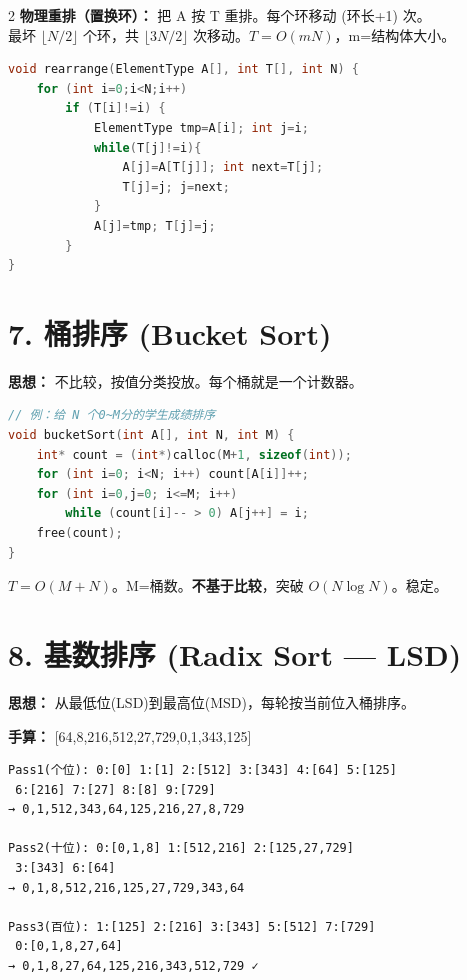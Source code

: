 \documentclass[10pt,a4paper]{article}
\begin{document}
\begin{multicols}{2}
\textbf{物理重排（置换环）：} 把 A 按 T 重排。每个环移动 (环长+1) 次。\\
最坏 $\lfloor N/2\rfloor$ 个环，共 $\lfloor 3N/2\rfloor$ 次移动。$T=O(mN)$，m=结构体大小。

\begin{lstlisting}[language=C]
void rearrange(ElementType A[], int T[], int N) {
    for (int i=0;i<N;i++)
        if (T[i]!=i) {
            ElementType tmp=A[i]; int j=i;
            while(T[j]!=i){
                A[j]=A[T[j]]; int next=T[j];
                T[j]=j; j=next;
            }
            A[j]=tmp; T[j]=j;
        }
}
\end{lstlisting}

\section*{7. 桶排序 (Bucket Sort)}

\textbf{思想：} 不比较，按值分类投放。每个桶就是一个计数器。

\begin{lstlisting}[language=C]
// 例：给 N 个0~M分的学生成绩排序
void bucketSort(int A[], int N, int M) {
    int* count = (int*)calloc(M+1, sizeof(int));
    for (int i=0; i<N; i++) count[A[i]]++;
    for (int i=0,j=0; i<=M; i++)
        while (count[i]-- > 0) A[j++] = i;
    free(count);
}
\end{lstlisting}

$T = O(M+N)$。M=桶数。\textbf{不基于比较}，突破 $O(N\log N)$。稳定。

\section*{8. 基数排序 (Radix Sort — LSD)}

\textbf{思想：} 从最低位(LSD)到最高位(MSD)，每轮按当前位入桶排序。

\textbf{手算：} [64,8,216,512,27,729,0,1,343,125]

\begin{verbatim}
Pass1(个位): 0:[0] 1:[1] 2:[512] 3:[343] 4:[64] 5:[125]
 6:[216] 7:[27] 8:[8] 9:[729]
→ 0,1,512,343,64,125,216,27,8,729

Pass2(十位): 0:[0,1,8] 1:[512,216] 2:[125,27,729]
 3:[343] 6:[64]
→ 0,1,8,512,216,125,27,729,343,64

Pass3(百位): 1:[125] 2:[216] 3:[343] 5:[512] 7:[729]
 0:[0,1,8,27,64]
→ 0,1,8,27,64,125,216,343,512,729 ✓
\end{verbatim}


\end{multicols}
\end{document}
